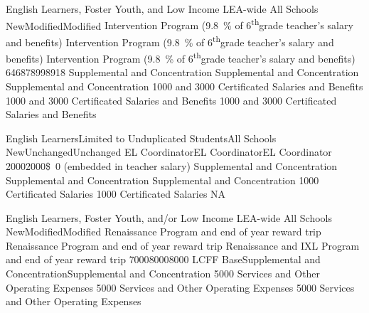 \documentclass{article}
\newcommand{\supth}{\textsuperscript{th}}
\newcommand{\dollar}[1]{\SI{#1}[\$]{}}
\newcounter{goal}[section] %
\newcounter{action}[goal]
\begin{document}
\begin{planactions}
	\planaction@scope
	{English Learners, Foster Youth, and Low Income}
	{LEA-wide}
	{All Schools}
	\planaction@action
	{New}{Modified}{Modified}
	{Intervention Program (\SI{9.8}{\percent} of 6\supth grade teacher's salary and benefits)}
	{Intervention Program (\SI{9.8}{\percent} of 6\supth grade teacher's salary and benefits)}
	{Intervention Program (\SI{9.8}{\percent} of 6\supth grade teacher's salary and benefits)}
	\planaction@budget
	{6468}{7899}{8918}
	{Supplemental and Concentration}
	{Supplemental and Concentration}
	{Supplemental and Concentration}
	{\num{1000} and \num{3000} Certificated Salaries and Benefits}
	{\num{1000} and \num{3000} Certificated Salaries and Benefits}
	{\num{1000} and \num{3000} Certificated Salaries and Benefits}

	\planaction@scope
	{English Learners}{Limited to Unduplicated Students}{All Schools}
	\planaction@action
	{New}{Unchanged}{Unchanged}
	{EL Coordinator}{EL Coordinator}{EL Coordinator}
	\planaction@budget
	{2000}{2000}{\dollar{0} (embedded in teacher salary)}
	{Supplemental and Concentration}
	{Supplemental and Concentration}
	{Supplemental and Concentration}
	{\num{1000} Certificated Salaries}
	{\num{1000} Certificated Salaries}
	{NA}

	\planaction@scope
	{English Learners, Foster Youth, and/or Low Income}
	{LEA-wide}
	{All Schools}
	\planaction@action
	{New}{Modified}{Modified}
	{Renaissance Program and end of year reward trip}
	{Renaissance Program and end of year reward trip}
	{Renaissance and IXL Program and end of year reward trip}
	\planaction@budget
	{7000}{8000}{8000}
	{LCFF Base}{Supplemental and Concentration}{Supplemental and Concentration}
	{\num{5000} Services and Other Operating Expenses}
	{\num{5000} Services and Other Operating Expenses}
	{\num{5000} Services and Other Operating Expenses}


\end{planactions}
\end{document}
